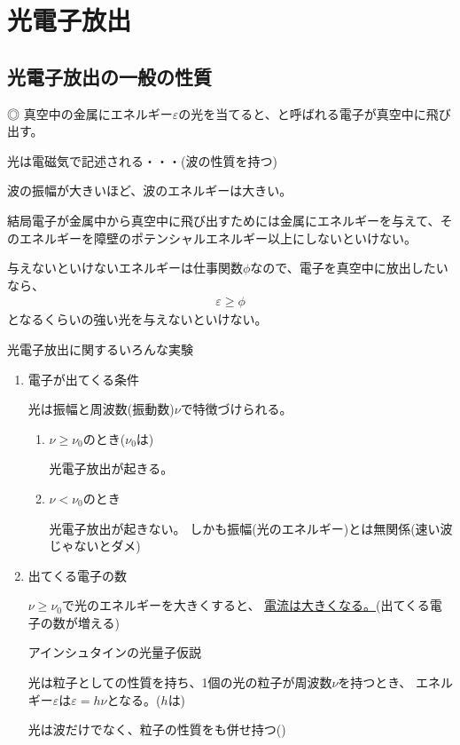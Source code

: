 \documentclass[12pt]{jsarticle}
\begin{document}
\clearpage
\section{光電子放出}
\subsection{光電子放出の一般の性質}
◎
真空中の金属にエネルギー$\varepsilon$の光を当てると、と呼ばれる電子が真空中に飛び出す。

光は電磁気で記述される・・・(波の性質を持つ)

波の振幅が大きいほど、波のエネルギーは大きい。

結局電子が金属中から真空中に飛び出すためには金属にエネルギーを与えて、そのエネルギーを障壁のポテンシャルエネルギー以上にしないといけない。

与えないといけないエネルギーは仕事関数$\phi$なので、電子を真空中に放出したいなら、
\begin{align*}
\varepsilon \ge \phi
\end{align*}
となるくらいの強い光を与えないといけない。


\begin{itembox}[l]{光電子放出に関するいろんな実験}
\begin{enumerate}
\item 電子が出てくる条件

光は振幅と周波数(振動数)$\nu$で特徴づけられる。
\begin{enumerate}
\item $\nu\ge\nu_0$のとき($\nu_0$は)

光電子放出が起きる。

\item $\nu<\nu_0$のとき

光電子放出が起きない。
しかも振幅(光のエネルギー)とは無関係(速い波じゃないとダメ)
\end{enumerate}

\item 出てくる電子の数

$\nu\ge\nu_0$で光のエネルギーを大きくすると、
\underline{電流は大きくなる。}(出てくる電子の数が増える)
\begin{itembox}[l]{アインシュタインの光量子仮説}

光は粒子としての性質を持ち、1個の光の粒子が周波数$\nu$を持つとき、
エネルギー$\varepsilon$は$\varepsilon=h\nu$となる。($h$は)
\end{itembox}
光は波だけでなく、粒子の性質をも併せ持つ()

\end{enumerate}
\end{itembox}
\end{document}
